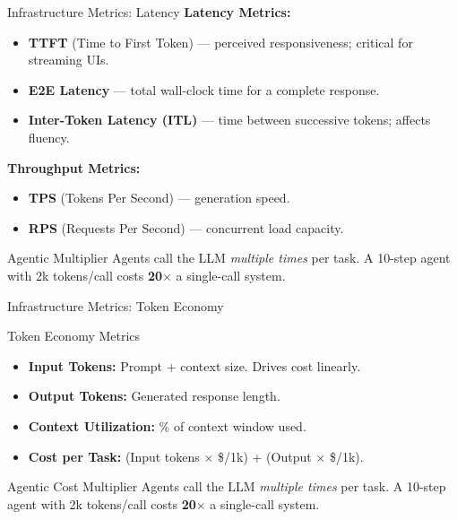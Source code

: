 \documentclass{beamer}       %
\begin{document}
\begin{frame}{Infrastructure Metrics: Latency}
    \small
    \textbf{Latency Metrics:}
    \begin{itemize}
        \item \textbf{TTFT} (Time to First Token) --- perceived responsiveness; critical for streaming UIs.
        \item \textbf{E2E Latency} --- total wall-clock time for a complete response.
        \item \textbf{Inter-Token Latency (ITL)} --- time between successive tokens; affects fluency.
    \end{itemize}
    \vspace{0.2cm}
    \textbf{Throughput Metrics:}
    \begin{itemize}
        \item \textbf{TPS} (Tokens Per Second) --- generation speed.
        \item \textbf{RPS} (Requests Per Second) --- concurrent load capacity.
    \end{itemize}
    \vfill
    \begin{alertblock}{Agentic Multiplier}
        \small Agents call the LLM \textit{multiple times} per task. A 10-step agent with 2k tokens/call costs \textbf{20$\times$} a single-call system.
    \end{alertblock}
\end{frame}

\begin{frame}{Infrastructure Metrics: Token Economy}
    \small
    \begin{block}{Token Economy Metrics}
        \begin{itemize}
            \item \textbf{Input Tokens:} Prompt + context size. Drives cost linearly.
            \item \textbf{Output Tokens:} Generated response length.
            \item \textbf{Context Utilization:} \% of context window used.
            \item \textbf{Cost per Task:} (Input tokens $\times$ \$/1k) + (Output $\times$ \$/1k).
        \end{itemize}
    \end{block}
    \vfill
    \begin{alertblock}{Agentic Cost Multiplier}
        \small Agents call the LLM \textit{multiple times} per task. A 10-step agent with 2k tokens/call costs \textbf{20$\times$} a single-call system.
    \end{alertblock}
\end{frame}
\end{document}
